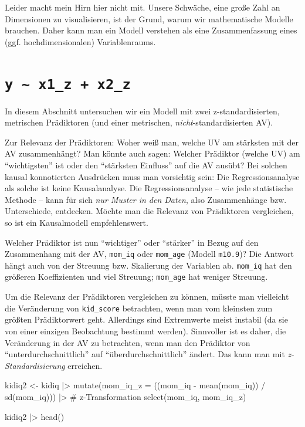 \documentclass[
  ngerman,
  letterpaper,
  twoside,
  open=any]{scrbook}
\newenvironment{Shaded}{\begin{snugshade}}{\end{snugshade}}
\newcommand{\AttributeTok}[1]{\textcolor[rgb]{0.40,0.45,0.13}{#1}}
\newcommand{\CommentTok}[1]{\textcolor[rgb]{0.37,0.37,0.37}{#1}}
\newcommand{\FunctionTok}[1]{\textcolor[rgb]{0.28,0.35,0.67}{#1}}
\newcommand{\NormalTok}[1]{\textcolor[rgb]{0.00,0.23,0.31}{#1}}
\newcommand{\OtherTok}[1]{\textcolor[rgb]{0.00,0.23,0.31}{#1}}
\newcommand{\SpecialCharTok}[1]{\textcolor[rgb]{0.37,0.37,0.37}{#1}}
\theoremstyle{definition}
\theoremstyle{plain}
\theoremstyle{definition}
\theoremstyle{definition}
\theoremstyle{definition}
\theoremstyle{definition}
\theoremstyle{remark}
\begin{document}
Leider macht mein Hirn hier nicht mit. Unsere Schwäche, eine große Zahl
an Dimensionen zu visualisieren, ist der Grund, warum wir mathematische
Modelle brauchen. Daher kann man ein Modell verstehen als eine
Zusammenfassung eines (ggf. hochdimensionalen) Variablenraums.

\section{\texorpdfstring{\texttt{y\ \textasciitilde{}\ x1\_z\ +\ x2\_z}}{y \textasciitilde{} x1\_z + x2\_z}}\label{y-x1_z-x2_z}

In diesem Abschnitt untersuchen wir ein Modell mit zwei
z-standardisierten, metrischen Prädiktoren (und einer metrischen,
\emph{nicht}-standardisierten AV).

Zur Relevanz der Prädiktoren: Woher weiß man, welche UV am stärksten mit
der AV zusammenhängt? Man könnte auch sagen: Welcher Prädiktor (welche
UV) am \enquote{wichtigsten} ist oder den \enquote{stärksten Einfluss}
auf die AV ausübt? Bei solchen kausal konnotierten Ausdrücken muss man
vorsichtig sein: Die Regressionsanalyse als solche ist keine
Kausalanalyse. Die Regressionsanalyse -- wie jede statistische Methode
-- kann für sich \emph{nur Muster in den Daten}, also Zusammenhänge bzw.
Unterschiede, entdecken. Möchte man die Relevanz von Prädiktoren
vergleichen, so ist ein Kausalmodell empfehlenswert.

Welcher Prädiktor ist nun \enquote{wichtiger} oder \enquote{stärker} in
Bezug auf den Zusammenhang mit der AV, \texttt{mom\_iq} oder
\texttt{mom\_age} (Modell \texttt{m10.9})? Die Antwort hängt auch von
der Streuung bzw. Skalierung der Variablen ab. \texttt{mom\_iq} hat den
größeren Koeffizienten und viel Streuung; \texttt{mom\_age} hat weniger
Streuung.

Um die Relevanz der Prädiktoren vergleichen zu können, müsste man
vielleicht die Veränderung von \texttt{kid\_score} betrachten, wenn man
vom kleinsten zum größten Prädiktorwert geht. Allerdings sind
Extremwerte meist instabil (da sie von einer einzigen Beobachtung
bestimmt werden). Sinnvoller ist es daher, die Veränderung in der AV zu
betrachten, wenn man den Prädiktor von \enquote{unterdurchschnittlich}
auf \enquote{überdurchschnittlich} ändert. Das kann man mit
\emph{z-Standardisierung} erreichen.

\begin{Shaded}
\begin{Highlighting}[]
\NormalTok{kidiq2 }\OtherTok{\textless{}{-}} 
\NormalTok{  kidiq }\SpecialCharTok{|\textgreater{}} 
  \FunctionTok{mutate}\NormalTok{(}\AttributeTok{mom\_iq\_z =}\NormalTok{ ((mom\_iq }\SpecialCharTok{{-}} \FunctionTok{mean}\NormalTok{(mom\_iq)) }\SpecialCharTok{/} \FunctionTok{sd}\NormalTok{(mom\_iq)))  }\SpecialCharTok{|\textgreater{}}  \CommentTok{\# z{-}Transformation}
  \FunctionTok{select}\NormalTok{(mom\_iq, mom\_iq\_z) }

\NormalTok{kidiq2 }\SpecialCharTok{|\textgreater{}} 
  \FunctionTok{head}\NormalTok{()}
\end{Highlighting}
\end{Shaded}
\end{document}
